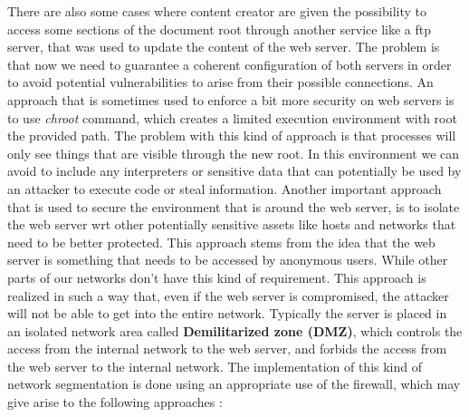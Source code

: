 There are also some cases where content creator are given the possibility to access some sections of the document root through another service like a ftp server, that was used to update the content of the web server. The problem is that now we need to guarantee a coherent configuration of both servers in order to avoid potential vulnerabilities to arise from their possible connections. An approach that is sometimes used to enforce a bit more security on web servers is to use \textit{chroot} command, which creates a limited execution environment with root the provided path. The problem with this kind of approach is that processes will only see things that are visible through the new root. In this environment we can avoid to include any interpreters or sensitive data that can potentially be used by an attacker to execute code or steal information. Another important approach that is used to secure the environment that is around the web server, is to isolate the web server wrt other potentially sensitive assets like hosts and networks that need to be better protected. This approach stems from the idea that the web server is something that needs to be accessed by anonymous users. While other parts of our networks don't have this kind of requirement. This approach is realized in such a way that, even if the web server is compromised, the attacker will not be able to get into the entire network. Typically the server is placed in an isolated network area called \textbf{Demilitarized zone (DMZ)}, which controls the access from the internal network to the web server, and forbids the access from the web server to the internal network. The implementation of this kind of network segmentation is done using an appropriate use of the firewall, which may give arise to the following approaches :
